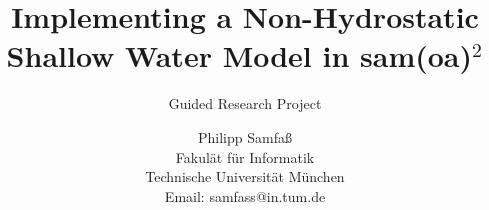 \documentclass[a4paper,pdftex]{scrartcl}
\begin{document}
\title{Implementing a Non-Hydrostatic Shallow
Water Model in sam(oa)$^2$}
\subtitle{Guided Research Project}

\author{
Philipp Samfaß\\
Fakul\"at f\"ur Informatik\\Technische Universit\"at M\"unchen\\
Email: samfass@in.tum.de 
}

\maketitle













\end{document}
